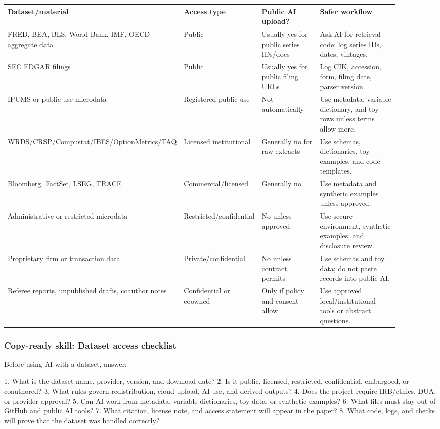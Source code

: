 \documentclass[11pt]{article}
\newcommand{\skill}[1]{\subsubsection*{Copy-ready skill: #1}}
\begin{document}
\begin{longtable}{p{0.26\linewidth}p{0.20\linewidth}p{0.18\linewidth}p{0.26\linewidth}}
\toprule
\textbf{Dataset/material} & \textbf{Access type} & \textbf{Public AI upload?} & \textbf{Safer workflow}\\
\midrule
FRED, BEA, BLS, World Bank, IMF, OECD aggregate data & Public & Usually yes for public series IDs/docs & Ask AI for retrieval code; log series IDs, dates, vintages.\\
SEC EDGAR filings & Public & Usually yes for public filing URLs & Log CIK, accession, form, filing date, parser version.\\
IPUMS or public-use microdata & Registered public-use & Not automatically & Use metadata, variable dictionary, and toy rows unless terms allow more.\\
WRDS/CRSP/Compustat/IBES/OptionMetrics/TAQ & Licensed institutional & Generally no for raw extracts & Use schemas, dictionaries, toy examples, and code templates.\\
Bloomberg, FactSet, LSEG, TRACE & Commercial/licensed & Generally no & Use metadata and synthetic examples unless approved.\\
Administrative or restricted microdata & Restricted/confidential & No unless approved & Use secure environment, synthetic examples, and disclosure review.\\
Proprietary firm or transaction data & Private/confidential & No unless contract permits & Use schemas and toy data; do not paste records into public AI.\\
Referee reports, unpublished drafts, coauthor notes & Confidential or coowned & Only if policy and consent allow & Use approved local/institutional tools or abstract questions.\\
\bottomrule
\end{longtable}

\skill{Dataset access checklist}

\begin{promptblock}
Before using AI with a dataset, answer:

1. What is the dataset name, provider, version, and download date?
2. Is it public, licensed, restricted, confidential, embargoed, or coauthored?
3. What rules govern redistribution, cloud upload, AI use, and derived outputs?
4. Does the project require IRB/ethics, DUA, or provider approval?
5. Can AI work from metadata, variable dictionaries, toy data, or synthetic examples?
6. What files must stay out of GitHub and public AI tools?
7. What citation, license note, and access statement will appear in the paper?
8. What code, logs, and checks will prove that the dataset was handled correctly?
\end{promptblock}
\end{document}
